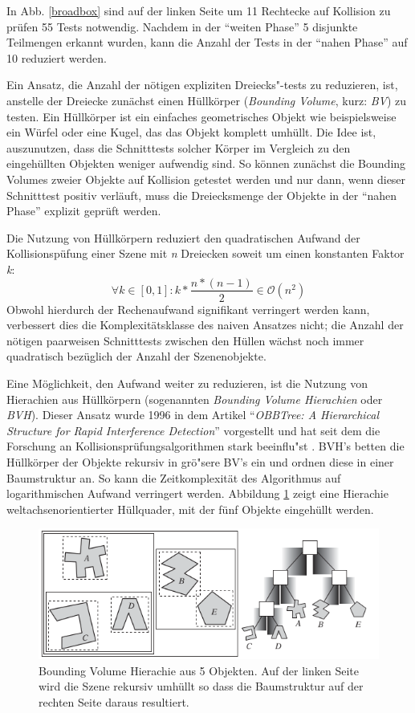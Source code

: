 In Abb. \ref{broadbox} sind auf der linken Seite um 11 Rechtecke auf Kollision zu pr\"ufen 55 Tests notwendig.
Nachdem in der "`weiten Phase"' 5 disjunkte Teilmengen erkannt wurden, kann die Anzahl der Tests in der "`nahen Phase"' auf 10 reduziert werden.

Ein Ansatz, die Anzahl der n\"otigen expliziten Dreiecks"-tests zu reduzieren, ist, anstelle der Dreiecke zun\"achst einen H\"ullk\"orper ({\em Bounding Volume}, kurz: {\em BV}) zu testen. Ein  H\"ullk\"orper ist ein
einfaches geometrisches Objekt wie beispielsweise ein W\"urfel oder eine Kugel, das das Objekt komplett
umh\"ullt. Die Idee ist, auszunutzen, dass die Schnitttests solcher K\"orper im Vergleich zu den eingeh\"ullten Objekten weniger aufwendig sind. So k\"onnen zun\"achst die Bounding Volumes zweier Objekte auf Kollision
getest\-et werden und nur dann, wenn dieser Schnitttest positiv verl\"auft, muss
die Dreiecksmenge der Objekte in der "`nahen Phase"' explizit gepr\"uft werden.

Die Nutzung von H\"ullk\"orpern reduziert den quadratischen Aufwand der Kollisionsp\"ufung einer Szene mit {\em n} Dreiecken soweit um einen konstanten Faktor {\em k}:
\begin{equation}
\forall k \in [0,1]:
k* \frac{n*(n-1)}{2} 
\in \mathcal O(n^2)
\end{equation}
Obwohl hierdurch der Rechenaufwand signifikant verringert werden kann, verbessert dies die Komplexit\"atsklasse des naiven Ansatzes nicht; die Anzahl der n\"otigen paarweisen Schnitttests zwischen den H\"ullen w\"achst noch immer
quadratisch bez\"uglich der Anzahl der Szenenobjekte.

Eine M\"oglichkeit, den Aufwand weiter zu reduzieren, ist die Nutzung von Hierachien aus H\"ullk\"orpern (sogenannten {\em Bounding Volume Hierachien} oder {\em BVH}). Dieser Ansatz wurde 1996 in dem Artikel "`{\em OBBTree: A Hierarchical Structure for Rapid Interference Detection}"' vorgestellt und hat seit dem die Forschung an Kollisionspr\"ufungsalgorithmen stark beeinflu"st \cite{Gottschalk}. BVH's betten die H\"ullk\"orper der Objekte rekursiv in gr\"o"sere BV's ein und ordnen diese in einer Baumstruktur an. So kann die Zeitkomplexit\"at des Algorithmus auf logarithmischen Aufwand verringert werden. Abbildung \ref{bvh} zeigt eine Hierachie weltachsenorientierter H\"ullquader, mit der f\"unf Objekte eingeh\"ullt werden.

\begin{figure}[H]
\centerline{
	\includegraphics[scale=0.60]{graphics/bvh.png}
}
\caption{Bounding Volume Hierachie aus 5 Objekten. Auf der linken Seite wird
die Szene rekursiv umh\"ullt so dass die Baumstruktur auf der rechten Seite
daraus resultiert. }
\label{bvh}
\end{figure}

